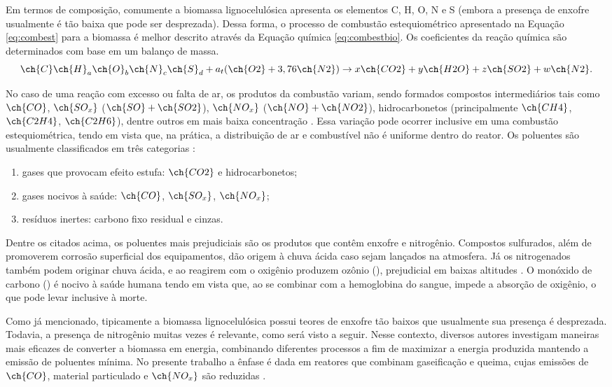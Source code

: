 Em termos de composição, comumente a biomassa lignocelulósica apresenta os elementos C, H, O, N e S (embora a presença de enxofre usualmente é tão baixa que pode ser desprezada). Dessa forma, o processo de combustão estequiométrico apresentado na Equação  \eqref{eq:combest} para a biomassa é melhor descrito através da Equação química \eqref{eq:combestbio}. Os coeficientes da reação química são determinados com base em um balanço de massa. 
\begin{equation} \label{eq:combestbio}
\ch{C} \ch{H}_a \ch{O}_b \ch{N}_c \ch{S}_d + a_t(\ch{O2} + 3,76 \ch{N2}) \rightarrow{} x \ch{CO2} + y \ch{H2O} + z \ch{SO2} + w \ch{N2}.
\end{equation}

No caso de uma reação com excesso ou falta de ar, os produtos da combustão variam, sendo formados compostos intermediários tais como $\ch{CO}$, $\ch{SO_{x}}$ ($\ch{SO} + \ch{SO2}$), $\ch{NO_{x}}$ ($\ch{NO} + \ch{NO2}$), hidrocarbonetos (principalmente $\ch{CH4}$, $\ch{C2H4}$, $\ch{C2H6}$), dentre outros em mais baixa concentração \cite{Lora}. Essa variação pode ocorrer inclusive em uma combustão estequiométrica, tendo em vista que, na prática, a distribuição de ar e combustível não é uniforme dentro do reator. Os poluentes são usualmente classificados em três categorias \cite{Amazonia}:
\begin{enumerate}[noitemsep,nosep,labelindent=\parindent,leftmargin=*,label={\alph*}) ] 
	\item gases que provocam efeito estufa: $\ch{CO2}$ e hidrocarbonetos;
	\item gases nocivos à saúde: $\ch{CO}$, $\ch{SO_{x}}$, $\ch{NO_{x}}$;
	\item resíduos inertes: carbono fixo residual e cinzas.
\end{enumerate}

Dentre os citados acima, os poluentes mais prejudiciais são os produtos que contêm enxofre e nitrogênio. Compostos sulfurados, além de promoverem corrosão superficial dos equipamentos, dão origem à chuva ácida caso sejam lançados na atmosfera. Já os nitrogenados também podem originar chuva ácida, e ao reagirem com o oxigênio produzem ozônio (), prejudicial em baixas altitudes \cite{Amazonia}. O monóxido de carbono () é nocivo à saúde humana tendo em vista que, ao se combinar com a hemoglobina do sangue, impede a absorção de oxigênio, o que pode levar inclusive à morte.

Como já mencionado, tipicamente a biomassa lignocelulósica possui teores de enxofre tão baixos que usualmente sua presença é desprezada. Todavia, a presença de nitrogênio muitas vezes é relevante, como será visto a seguir. Nesse contexto, diversos autores investigam maneiras mais eficazes de converter a biomassa em energia, combinando diferentes processos a fim de maximizar a energia produzida mantendo a emissão de poluentes mínima. No presente trabalho a ênfase é dada em reatores que combinam gaseificação e queima, cujas emissões de $\ch{CO}$, material particulado e $\ch{NO_{x}}$ são reduzidas \cite{Kirch2018}.

